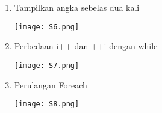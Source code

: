 \documentclass[8pt, a4paper]{article}
\newcommand{\lstinputwithcaption}[2]{%
    }
\begin{document}
\begin{enumerate}
          \begin{multicols}{2}
            \begin{center}
              \lstinputwithcaption{./code/src/soal5/Main.java}{Main.java}
              \texttt{[image: S5.png]}
            \end{center}
          \end{multicols}

        \item Tampilkan angka sebelas dua kali

          \begin{multicols}{2}
            \begin{center}
              \lstinputwithcaption{./code/src/soal6/Main.java}{Main.java}
              \columnbreak
              \texttt{[image: S6.png]}
            \end{center}
          \end{multicols}

        \item Perbedaan i++ dan ++i dengan while

          \begin{multicols}{2}
            \begin{center}
              \lstinputwithcaption{./code/src/soal7/Main.java}{Main.java}
              \texttt{[image: S7.png]}
            \end{center}
          \end{multicols}

        \item Perulangan Foreach

          \begin{multicols}{2}
            \lstinputwithcaption{./code/src/soal8/Main.java}{Main.java}
            \columnbreak
            \begin{center}
              \texttt{[image: S8.png]}
            \end{center}
          \end{multicols}

      \end{enumerate}

    
\end{document}
